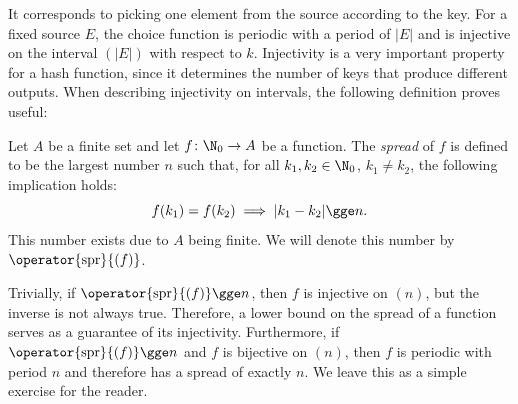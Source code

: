 \documentclass[12pt, a4paper]{article}
\newcommand{\spr}[1]{\operator{\mathrm{spr}}{\left(#1\right)}}
\begin{document}
It corresponds to picking one element from the source according to the key. For a fixed source $ E $, the choice function is periodic with a period of $ |E| $ and is injective  on the interval $ (|E|) $ with respect to $ k $. Injectivity is a very important property for a hash function, since it determines the number of keys that produce different outputs. When describing injectivity on intervals, the following definition proves useful:

\begin{definition}
    Let $ A $ be a finite set and let $ f \colon \N_0 \to A $ be a function. The \emph{spread} of $ f $ is defined to be the largest number $ n $ such that, for all $ k_1, k_2 \in \N_0 $, $ k_1 \ne k_2 $, the following implication holds:
    \[ f(k_1) = f(k_2) \implies |k_1 - k_2| \gge n. \]
    This number exists due to $ A $ being finite. We will denote this number by $ \spr{f} $.
\end{definition}

Trivially, if $ \spr{f} \gge n $, then $ f $ is injective on $ (n) $, but the inverse is not always true. Therefore, a lower bound on the spread of a function serves as a guarantee of its injectivity. Furthermore, if $ \spr{f} \gge n $ and $ f $ is bijective on $ (n) $, then $ f $ is periodic with period $ n $ and therefore has a spread of exactly $ n $. We leave this as a simple exercise for the reader.
\end{document}
